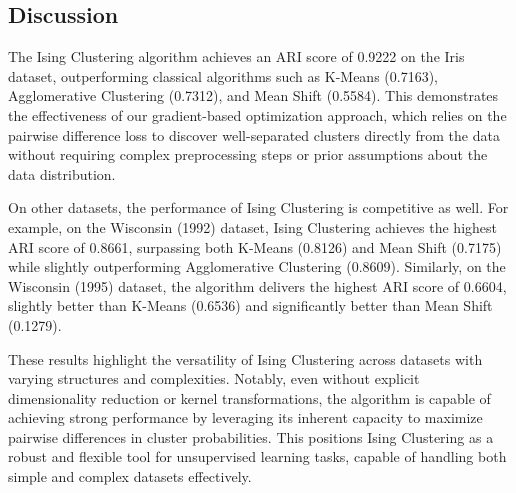 \documentclass[journal]{IEEEtran}
\begin{document}
\subsection{Discussion}



The Ising Clustering algorithm achieves an ARI score of 0.9222 on the Iris dataset, outperforming classical algorithms such as K-Means (0.7163), Agglomerative Clustering (0.7312), and Mean Shift (0.5584). This demonstrates the effectiveness of our gradient-based optimization approach, which relies on the pairwise difference loss to discover well-separated clusters directly from the data without requiring complex preprocessing steps or prior assumptions about the data distribution.

On other datasets, the performance of Ising Clustering is competitive as well. For example, on the Wisconsin (1992) dataset, Ising Clustering achieves the highest ARI score of 0.8661, surpassing both K-Means (0.8126) and Mean Shift (0.7175) while slightly outperforming Agglomerative Clustering (0.8609). Similarly, on the Wisconsin (1995) dataset, the algorithm delivers the highest ARI score of 0.6604, slightly better than K-Means (0.6536) and significantly better than Mean Shift (0.1279).

These results highlight the versatility of Ising Clustering across datasets with varying structures and complexities. Notably, even without explicit dimensionality reduction or kernel transformations, the algorithm is capable of achieving strong performance by leveraging its inherent capacity to maximize pairwise differences in cluster probabilities. This positions Ising Clustering as a robust and flexible tool for unsupervised learning tasks, capable of handling both simple and complex datasets effectively.

\end{document}
